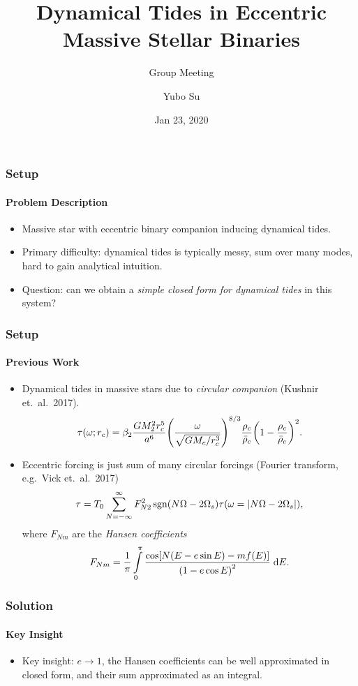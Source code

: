 \documentclass[dvipsnames]{beamer}
\DeclareMathOperator{\sgn}{sgn}
\DeclarePairedDelimiter\abs{\lvert}{\rvert}
\DeclarePairedDelimiter\p{\lparen}{\rparen}
\DeclarePairedDelimiter\s{\lbrack}{\rbrack}
\begin{document}
\title{Dynamical Tides in Eccentric Massive Stellar Binaries}
\subtitle{Group Meeting}
\author{Yubo Su}
\date{Jan 23, 2020}

\maketitle

\begin{frame}
    \frametitle{Setup}
    \framesubtitle{Problem Description}

    \begin{itemize}
        \item Massive star with eccentric binary companion inducing dynamical
            tides.

        \item Primary difficulty: dynamical tides is typically messy, sum over
            many modes, hard to gain analytical intuition.

        \item Question: can we obtain a \emph{simple closed form for dynamical
            tides} in this system?
    \end{itemize}
\end{frame}

\begin{frame}
    \frametitle{Setup}
    \framesubtitle{Previous Work}
    {\small
    \begin{itemize}
        \item Dynamical tides in massive stars due to \emph{circular
            companion} (Kushnir et.\ al.\ 2017).
            \begin{equation}
                \tau(\omega; r_c) = \beta_2\frac{GM_2^2r_c^5}{a^6}
                    \p*{\frac{\omega}{\sqrt{GM_c/r_c^3}}}^{8/3}
                        \frac{\rho_c}{\bar{\rho}_c} \p*{1 -
                        \frac{\rho_c}{\bar{\rho}_c}}^2.
            \end{equation}

        \item Eccentric forcing is just sum of many circular forcings
            (Fourier transform, e.g.\ Vick et.\ al.\ 2017)
            \begin{equation}
                \tau = T_0 \sum\limits_{N = -\infty}^\infty
                    F_{N2}^2 \sgn\p*{N\Omega - 2\Omega_s} \tau
                        \p*{\omega = \abs*{N\Omega - 2\Omega_s}},
            \end{equation}
            where $F_{Nm}$ are the \emph{Hansen coefficients}
            \begin{equation}
                F_{Nm} = \frac{1}{\pi}\int\limits_{0}^{\pi}
                    \frac{\cos\s*{N\p*{E - e\sin E} - mf(E)}}
                        {\p*{1 - e\cos E}^2}\;\mathrm{d}E.
            \end{equation}
    \end{itemize}
    }
\end{frame}

\begin{frame}
    \frametitle{Solution}
    \framesubtitle{Key Insight}

    \begin{itemize}
        \item Key insight: $e \to 1$, the Hansen coefficients can be well
            approximated in closed form, and their sum approximated as an
            integral.
    \end{itemize}
\end{frame}
\end{document}
